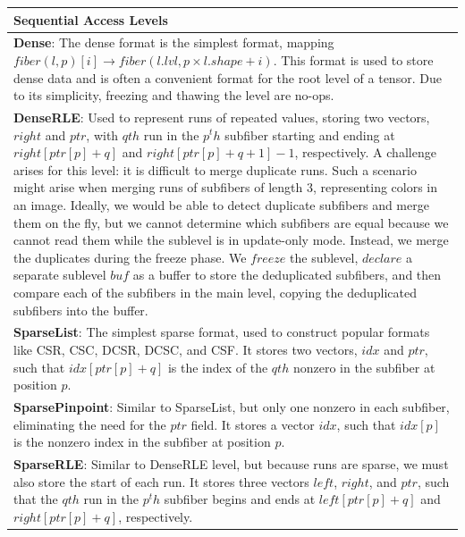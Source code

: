 \begin{table}[ht]
    \centering
    \footnotesize
    \begin{tabular}{p{14cm}}

    \hline
    \textbf{Sequential Access Levels} \\
    \hline
    \textbf{Dense}:
    The dense format is the simplest format, mapping $fiber(l, p)[i] \rightarrow fiber(l.lvl, p \times l.shape + i)$.
    This format is used to store dense data and is often a convenient format for the root level of a tensor.
    Due to its simplicity, freezing and thawing the level are no-ops. \\
    \textbf{DenseRLE}:
    Used to represent runs of repeated values, storing two vectors, $right$ and $ptr$, with $qth$ run in the $p^th$ subfiber starting and ending at $right[ptr[p] + q]$ and $right[ptr[p] + q + 1] - 1$, respectively.
    A challenge arises for this level: it is difficult to merge duplicate runs.
    Such a scenario might arise when merging runs of subfibers of length 3, representing colors in an image.
    Ideally, we would be able to detect duplicate subfibers and merge them on the fly, but we cannot determine which subfibers are equal because we cannot read them while the sublevel is in update-only mode.
    Instead, we merge the duplicates during the freeze phase.
    We $freeze$ the sublevel, $declare$ a separate sublevel $buf$ as a buffer to store the deduplicated subfibers, and then compare each of the subfibers in the main level, copying the deduplicated subfibers into the buffer. \\
    \textbf{SparseList}:
    The simplest sparse format, used to construct popular formats like CSR, CSC, DCSR, DCSC, and CSF.
    It stores two vectors, $idx$ and $ptr$, such that $idx[ptr[p] + q]$ is the index of the $qth$ nonzero in the subfiber at position $p$. \\
    \textbf{SparsePinpoint}:
    Similar to SparseList, but only one nonzero in each subfiber, eliminating the need for the $ptr$ field.
    It stores a vector $idx$, such that $idx[p]$ is the nonzero index in the subfiber at position $p$. \\
    \textbf{SparseRLE}:
    Similar to DenseRLE level, but because runs are sparse, we must also store the start of each run.
    It stores three vectors $left$, $right$, and $ptr$, such that the $qth$ run in the $p^th$ subfiber begins and ends at $left[ptr[p] + q]$ and $right[ptr[p] + q]$, respectively.

\end{tabular}
\end{table}
